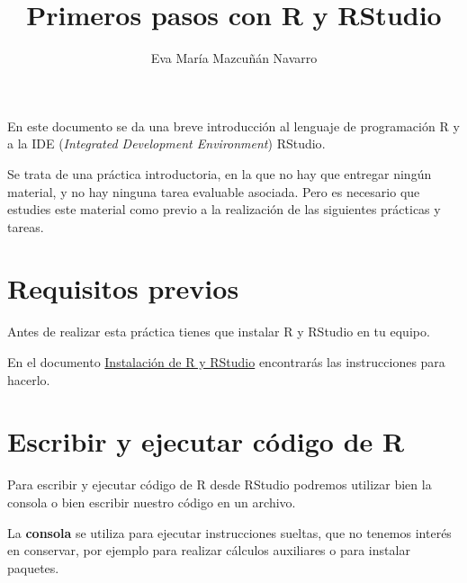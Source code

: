 \documentclass[
  title=normal,
  notoc,
  bib=normal]{mnye}
\title{Primeros pasos con R y RStudio}
\author{Eva María Mazcuñán Navarro}
\date{}
\begin{document}
\maketitle

%

{
\hypersetup{linkcolor=etoccolor}
\setcounter{tocdepth}{2}
\tableofcontents
}
\hypertarget{section}{%
\section*{}\label{section}}

En este documento se da una breve introducción al lenguaje de programación \textsf{R} y a la IDE (\textit{Integrated Development Environment}) \textsf{RStudio}.

Se trata de una práctica introductoria, en la que no hay que entregar ningún material, y no hay ninguna tarea evaluable asociada. Pero es necesario
que estudies este material como previo a la realización de las siguientes prácticas y tareas.

\hypertarget{prerequisites}{%
\section{Requisitos previos}\label{prerequisites}}

Antes de realizar esta práctica tienes que instalar \textsf{R} y \textsf{RStudio} en tu equipo.

En el documento \href{https://emazcunan.github.io/install-r-rstudio}{Instalación de R y RStudio} encontrarás las instrucciones para hacerlo.

\href{https://drive.google.com/uc?id=1_6-TIKa2_0Ty4sAI7cZ1lSt7vfY1FE6q&export=view}{\faVideoCamera}

\hypertarget{rmarkdown}{%
\section{Escribir y ejecutar código de R}\label{rmarkdown}}

Para escribir y ejecutar código de \textsf{R} desde \textsf{RStudio} podremos utilizar bien la consola o bien escribir nuestro código en un archivo.

La \textbf{consola} se utiliza para ejecutar instrucciones sueltas, que no tenemos interés en conservar, por ejemplo para realizar cálculos auxiliares o para instalar paquetes.
\end{document}
